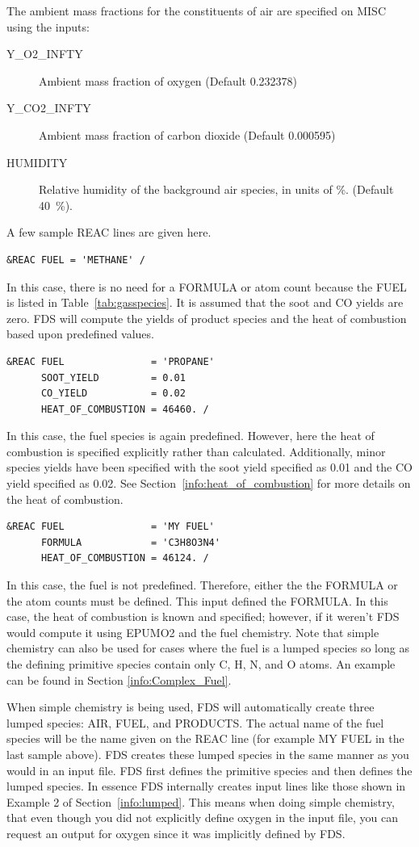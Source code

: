 \documentclass[11pt]{book}
\begin{document}
The ambient mass fractions for the constituents of air are specified on {\ct MISC} using the inputs:
\begin{description}
\item[{\ct Y\_O2\_INFTY}] Ambient mass fraction of oxygen (Default 0.232378)
\item[{\ct Y\_CO2\_INFTY}] Ambient mass fraction of carbon dioxide (Default 0.000595)
\item[{\ct HUMIDITY}] Relative humidity of the background air species, in units of \%. (Default 40~\%).
\end{description}
A few sample {\ct REAC} lines are given here.
\begin{lstlisting}
&REAC FUEL = 'METHANE' /
\end{lstlisting}
In this case, there is no need for a {\ct FORMULA} or atom count because the {\ct FUEL} is listed in Table~\ref{tab:gasspecies}. It is assumed that the soot and CO yields are zero.  FDS will compute the yields of product species and the heat of combustion based upon predefined values.
\begin{lstlisting}
&REAC FUEL               = 'PROPANE'
      SOOT_YIELD         = 0.01
      CO_YIELD           = 0.02
      HEAT_OF_COMBUSTION = 46460. /
\end{lstlisting}
In this case, the fuel species is again predefined.  However, here the heat of combustion is specified explicitly rather than calculated. Additionally, minor species yields have been specified with the soot yield specified as 0.01 and the CO yield specified as 0.02.
See Section~\ref{info:heat_of_combustion} for more details on the heat of combustion.
\begin{lstlisting}
&REAC FUEL               = 'MY FUEL'
      FORMULA            = 'C3H8O3N4'
      HEAT_OF_COMBUSTION = 46124. /
\end{lstlisting}
In this case, the fuel is not predefined.  Therefore, either the the {\ct FORMULA} or the atom counts must be defined.  This input defined the {\ct FORMULA}. In this case, the heat of combustion is known and specified; however, if it weren't FDS would compute it using {\ct EPUMO2} and the fuel chemistry. Note that simple chemistry can also be used for cases where the fuel is a lumped species so long as the defining primitive species contain only C, H, N, and O atoms. An example can be found in Section \ref{info:Complex_Fuel}.

When simple chemistry is being used, FDS will automatically create three lumped species: {\ct AIR}, {\ct FUEL}, and {\ct PRODUCTS}.  The actual name of the fuel species will be the name given on the {\ct REAC} line (for example {\ct MY FUEL} in the last sample above). FDS creates these lumped species in the same manner as you would in an input file.  FDS first defines the primitive species and then defines the lumped species. In essence FDS internally creates input lines like those shown in Example 2 of Section~\ref{info:lumped}. This means when doing simple chemistry, that even though you did not explicitly define oxygen in the input file, you can request an output for oxygen since it was implicitly defined by FDS.
\end{document}
